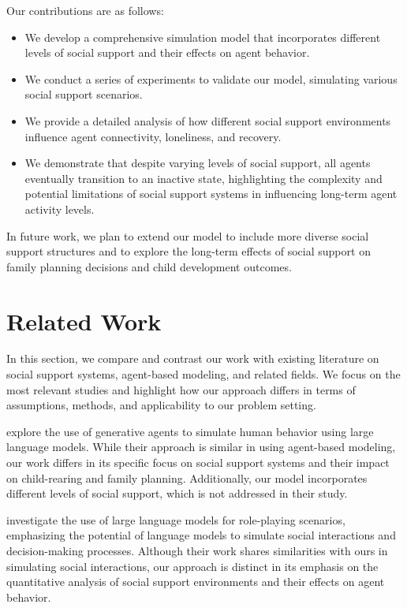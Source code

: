 \documentclass{article} %
\begin{document}
Our contributions are as follows:
\begin{itemize}
    \item We develop a comprehensive simulation model that incorporates different levels of social support and their effects on agent behavior.
    \item We conduct a series of experiments to validate our model, simulating various social support scenarios.
    \item We provide a detailed analysis of how different social support environments influence agent connectivity, loneliness, and recovery.
    \item We demonstrate that despite varying levels of social support, all agents eventually transition to an inactive state, highlighting the complexity and potential limitations of social support systems in influencing long-term agent activity levels.
\end{itemize}

In future work, we plan to extend our model to include more diverse social support structures and to explore the long-term effects of social support on family planning decisions and child development outcomes.

\section{Related Work}
\label{sec:related}

In this section, we compare and contrast our work with existing literature on social support systems, agent-based modeling, and related fields. We focus on the most relevant studies and highlight how our approach differs in terms of assumptions, methods, and applicability to our problem setting.

\citet{park2023generative} explore the use of generative agents to simulate human behavior using large language models. While their approach is similar in using agent-based modeling, our work differs in its specific focus on social support systems and their impact on child-rearing and family planning. Additionally, our model incorporates different levels of social support, which is not addressed in their study.

\citet{shanahan2023role} investigate the use of large language models for role-playing scenarios, emphasizing the potential of language models to simulate social interactions and decision-making processes. Although their work shares similarities with ours in simulating social interactions, our approach is distinct in its emphasis on the quantitative analysis of social support environments and their effects on agent behavior.
\end{document}
